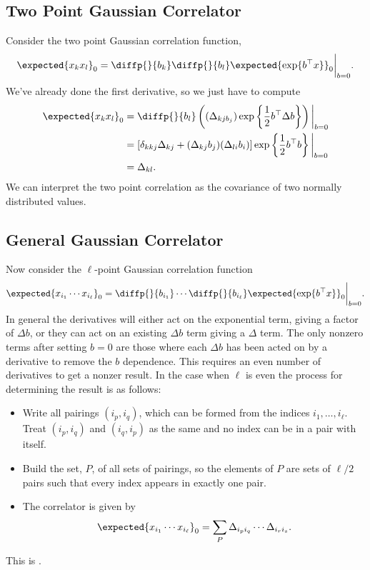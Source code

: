 \documentclass[fleqn]{NotesClass}
\newcommand{\trans}{{\top}}
\begin{document}
    \subsection{Two Point Gaussian Correlator}
    Consider the two point Gaussian correlation function,
    \begin{equation}
        \expected{x_kx_l}_{0} = \diffp{}{b_k}\diffp{}{b_l} \expected{\exp\{b^\trans x\}}_0 \bigg|_{b = 0}.
    \end{equation}
    We've already done the first derivative, so we just have to compute
    \begin{align}
        \expected{x_kx_l}_0 &= \diffp{}{b_l} \left( (\Delta_{kj b_j})\exp\left\{ \frac{1}{2}b^\trans \Delta b \right\} \right)\bigg|_{b = 0}\\
        &= [\delta_{kkj}\Delta_{kj} + (\Delta_{kj}b_j)(\Delta_{li}b_i)] \exp\left\{ \frac{1}{2}b^\trans b \right\}\bigg|_{b = 0}\\
        &= \Delta_{kl}.
    \end{align}
    We can interpret the two point correlation as the covariance of two normally distributed values.
    
    \subsection{General Gaussian Correlator}
    Now consider the \(\ell\)-point Gaussian correlation function
    \begin{equation}
        \expected{x_{i_1} \dotsm x_{i_\ell}}_0 = \diffp{}{b_{i_1}} \dotsm \diffp{}{b_{i_\ell}} \expected{\exp\{b^\trans x\}}_0 \bigg|_{b = 0}.
    \end{equation}
    In general the derivatives will either act on the exponential term, giving a factor of \(\Delta b\), or they can act on an existing \(\Delta b\) term giving a \(\Delta\) term.
    The only nonzero terms after setting \(b = 0\) are those where each \(\Delta b\) has been acted on by a derivative to remove the \(b\) dependence.
    This requires an even number of derivatives to get a nonzer result.
    In the case when \(\ell\) is even the process for determining the result is as follows:
    \begin{itemize}
        \item Write all pairings \((i_p, i_q)\), which can be formed from the indices \(i_1, \dotsc, i_\ell\).
        Treat \((i_p, i_q)\) and \((i_q, i_p)\) as the same and no index can be in a pair with itself.
        \item Build the set, \(P\), of all sets of pairings, so the elements of \(P\) are sets of \(\ell/2\) pairs such that every index appears in exactly one pair.
        \item The correlator is given by
        \begin{equation}
            \expected{x_{i_1}\dotsm x_{i_\ell}}_0 = \sum_{P} \Delta_{i_p i_q} \dotsm \Delta_{i_ri_s}.
        \end{equation}
    \end{itemize}
    This is .
    
\end{document}
